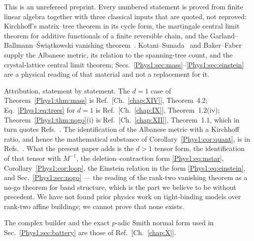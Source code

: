 This is an unrefereed preprint. Every numbered statement is proved from finite linear
algebra together with three classical inputs that are quoted, not reproved: Kirchhoff's
matrix--tree theorem in its cycle form, the martingale central limit theorem for additive
functionals of a finite reversible chain, and the Garland--Ballmann--\'Swi\k{a}tkowski
vanishing theorem~\cite{Ga,BSw}. Kotani--Sunada~\cite{KS1,KS2,KS3} and Baker--Faber~\cite{BF}
supply the Albanese metric, its relation to the spanning-tree count, and the
crystal-lattice central limit theorem; Secs.~\ref{Phys1:sec:mass}--\ref{Phys1:sec:einstein} are a
physical reading of that material and not a replacement for it.

Attribution, statement by statement. The $d=1$ case of Theorem~\ref{Phys1:thm:mass} is
Ref.~[Ch.~\ref{chap:XIV}], Theorem~4.2; Eq.~\eqref{Phys1:eq:trees} for $d=1$ is
Ref.~[Ch.~\ref{chap:IX}], Theorem~1.2(iv); Theorem~\ref{Phys1:thm:nogo}(i) is
Ref.~[Ch.~\ref{chap:XII}], Theorem~1.1, which in turn quotes Refs.~. The
identification of the Albanese metric with a Kirchhoff ratio, and hence the mathematical
substance of Corollary~\ref{Phys1:cor:quant}, is in Refs.~. What the present
paper adds is the $d>1$ tensor form, the identification of that tensor with $M^{-1}$, the
deletion--contraction form \eqref{Phys1:eq:mstar}, Corollary~\ref{Phys1:cor:loop}, the Einstein relation
in the form \eqref{Phys1:eq:einstein}, and Sec.~\ref{Phys1:sec:nogo} --- the reading of the rank-two
vanishing theorem as a no-go theorem for band structure, which is the part we believe to be
without precedent. We have not found prior physics work on tight-binding models over
rank-two affine buildings; we cannot prove that none exists.

\begin{acknowledgments}
The complex builder and the exact $p$-adic Smith normal form used in Sec.~\ref{Phys1:sec:battery}
are those of Ref.~[Ch.~\ref{chap:X}].
\end{acknowledgments}

